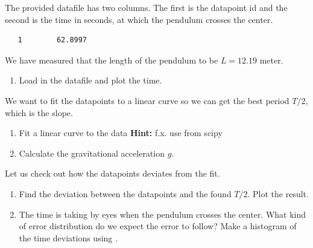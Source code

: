 \documentclass{article}
\begin{document}

The provided datafile has two columns.
The first is the datapoint id and the second is the time in seconds, at which the pendulum crosses the center.
\begin{lstlisting}
   1        62.8997
\end{lstlisting}

We have measured that the length of the pendulum to be $L = 12.19$ meter.

\begin{enumerate}

    \item Load in the datafile and plot the time.

\end{enumerate}

We want to fit the datapoints to a linear curve so we can get the best period $T/2$, which is the slope.

\begin{enumerate}[resume]

    \item Fit a linear curve to the data { {\bf Hint:} f.x. use  from scipy}

    \item Calculate the gravitational acceleration $g$.

\end{enumerate}

Let us check out how the datapoints deviates from the fit.

\begin{enumerate}[resume]

    \item Find the deviation between the datapoints and the found $T/2$. 
          Plot the result.

    \item The time is taking by eyes when the pendulum crosses the center. 
          What kind of error distribution do we expect the error to follow?
          Make a histogram of the time deviations using . 

\end{enumerate}

%
%
%
\end{document}
